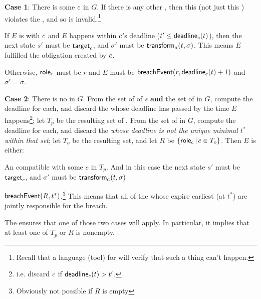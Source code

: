 \documentclass[12pt]{article}
\begin{document}
{\bf Case 1}: There is some \enabled \mustnarule $c$ in $G$. If there is any other \enabled \actionrule, then this \Contract (not just this \trace) violates the \uaocz, and so is invalid.\footnote{Recall that a language (tool) for \Contracts will verify that such a thing can't happen.}
\begin{PPI}
    \item If $E$ is \compatible with $c$ and $E$ happens within $c$'s deadline ($t' \leq \textsf{deadline}_{c}(t)$), then the next state $s'$ must be $\textsf{target}_{c}$, and $\sigma'$ must be $\textsf{transform}_{a}(t,\sigma)$. This means $E$ fulfilled the obligation created by $c$.
    \item Otherwise, $\textsf{role}_{e}$ must be $r$ and $E$ must be $\textsf{breachEvent}(r,\textsf{deadline}_{c}(t) + 1)$ and $\sigma' = \sigma$. %
\end{PPI}

{\bf Case 2}: There is no \enabled \mustnarule in $G$. From the set of \enabled \maynarules of $s$ {\bf and} the set of \enabled \rmustnarules in $G$, compute the deadline for each, and discard the \actionrules whose deadline has passed by the time $E$ happens\footnote{i.e. discard $c$ if $\textsf{deadline}_{c}(t) > t'$.};  let $T_p$ be the resulting set of \actionrules. From the set of \enabled \rmustnarules in $G$, compute the deadline for each, and discard the {\actionrules} {\it whose deadline is not the unique minimal \TimeStamp $t^*$ within that set}; let $T_o$ be the resulting set, and let $R$ be $\{ \textsf{role}_{c} \, \vert \, c \in T_{o} \}$. Then $E$ is either:
\begin{PPI}
	\item An \Event compatible with some \actionrule $e$ in $T_p$. And in this case the next state $s'$ must be $\textsf{target}_{c}$, and $\sigma'$ must be $\textsf{transform}_{a}(t,\sigma)$
	\item $\textsf{breachEvent}(R,t^*)$.\footnote{Obviously not possible if $R$ is empty} This means that all of the \Roles whose \enabled \rmustnarule expire earliest (at $t^*$) are jointly responsible for the breach.
\end{PPI}
The \bostgcz ensures that one of those two cases will apply. In particular, it implies that at least one of $T_p$ or $R$ is nonempty.
\end{document}
